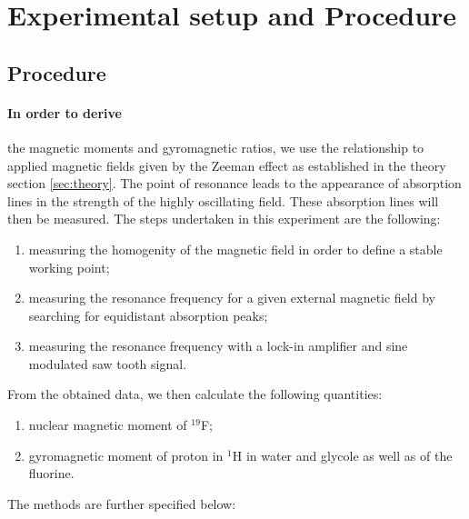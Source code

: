 \section{Experimental setup and Procedure}
\subsection{Procedure}
\label{ssubsec:procedure}
\paragraph{In order to derive} the magnetic moments and gyromagnetic ratios, 
we use the relationship to applied magnetic fields given by the Zeeman effect 
as established in the theory section \ref{sec:theory}. 
The point of resonance leads to the appearance of absorption lines 
in the strength of the highly oscillating field. These absorption lines 
will then be measured. 
The steps undertaken in this experiment are the following:
\begin{enumerate}
\item
measuring the homogenity of the magnetic field in order to define a stable working point;
\item
measuring the resonance frequency for a given external magnetic field by searching for 
equidistant absorption peaks;
\item
measuring the resonance frequency with a lock-in amplifier and sine modulated saw tooth signal.
\end{enumerate}
From the obtained data, we then calculate the following quantities:
\begin{enumerate}
\item
    nuclear magnetic moment of $^{19}$F;
\item
    gyromagnetic moment of proton in $^1$H in water and glycole as well as of the fluorine.
\end{enumerate}
The methods are further specified below:
